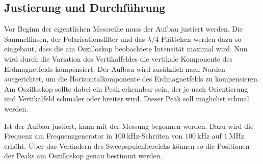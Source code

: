 \subsection{Justierung und Durchführung}

Vor Beginn der eigentlichen Messreihe muss der Aufbau justiert werden.
Die Sammellinsen, der Polarisationsfilter und das $\lambda/4$-Plättchen werden dazu so eingebaut, dass die am Oszilloskop beobachtete Intensität maximal wird.
Nun wird durch die Variation des Vertikalfeldes die vertikale Komponente des Erdmagnetfelds kompensiert. 
Der Aufbau wird zusätzlich nach Norden ausgerichtet, um die Horizontalkomponente des Erdmagnetfelds zu kompensieren.
Am Oszilloskop sollte dabei ein Peak erkennbar sein, der je nach Orientierung und Vertikalfeld schmaler oder breiter wird.
Dieser Peak soll möglichst schmal werden.

Ist der Aufbau justiert, kann mit der Messung begonnen werden. 
Dazu wird die Frequenz am Frequenzgenerator in $\SI{100}{\kilo\hertz}$-Schriiten von $\SI{100}{\kilo\hertz}$ auf $\SI{1}{\mega\hertz}$ erhöht.
Über das Verändern des Sweepspulenbereichs können so die Positionen der Peaks am Oszilloskop genau bestimmt werden.